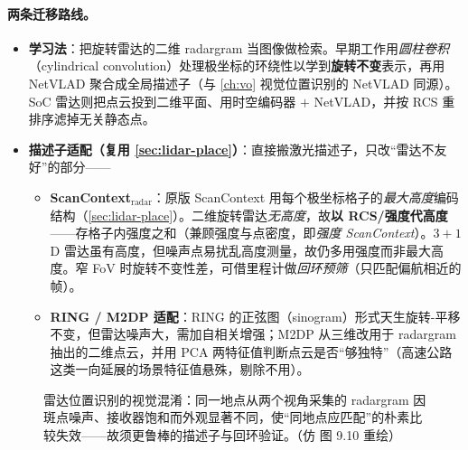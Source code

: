 \paragraph{两条迁移路线。}
\begin{itemize}
  \item \textbf{学习法}：把旋转雷达的二维 radargram 当图像做检索。早期工作用\emph{圆柱卷积}（cylindrical convolution）处理极坐标的环绕性以学到\textbf{旋转不变}表示，再用 NetVLAD 聚合成全局描述子（与 \cref{ch:vo} 视觉位置识别的 NetVLAD 同源）。SoC 雷达则把点云投到二维平面、用时空编码器 $+$ NetVLAD，并按 RCS 重排序滤掉无关静态点。
  \item \textbf{描述子适配（复用 \cref{sec:lidar-place}）}：直接搬激光描述子，只改“雷达不友好”的部分——
  \begin{itemize}
    \item \textbf{ScanContext$_\text{radar}$}：原版 ScanContext 用每个极坐标格子的\emph{最大高度}编码结构（\cref{sec:lidar-place}）。二维旋转雷达\emph{无高度}，故\textbf{以 RCS/强度代高度}——存格子内强度之和（兼顾强度与点密度，即\emph{强度 ScanContext}）。$3{+}1$D 雷达虽有高度，但噪声点易扰乱高度测量，故仍多用强度而非最大高度。窄 FoV 时旋转不变性差，可借里程计做\emph{回环预筛}（只匹配偏航相近的帧）。
    \item \textbf{RING / M2DP 适配}：RING 的正弦图（sinogram）形式天生旋转-平移不变，但雷达噪声大，需加自相关增强；M2DP 从三维改用于 radargram 抽出的二维点云，并用 PCA 两特征值判断点云是否“够独特”（高速公路这类一向延展的场景特征值悬殊，剔除不用）。
  \end{itemize}
\end{itemize}

\begin{figure}[ht]
\centering
{}
\caption{雷达位置识别的视觉混淆：同一地点从两个视角采集的 radargram 因斑点噪声、接收器饱和而外观显著不同，使“同地点应匹配”的朴素比较失效——故须更鲁棒的描述子与回环验证。（仿 \cite{carlone2026handbook} 图 9.10 重绘）}
\label{fig:radar-aliasing}
\end{figure}

